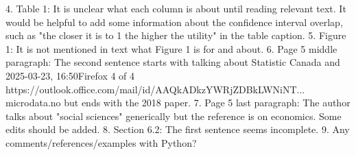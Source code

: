 \begin{referee}
4.
Table 1: It is unclear what each column is about until reading relevant text. It would be helpful to
add some information about the confidence interval overlap, such as "the closer it is to 1 the higher
the utility" in the table caption.
5.
Figure 1: It is not mentioned in text what Figure 1 is for and about.
6.
Page 5 middle paragraph: The second sentence starts with talking about Statistic Canada and
2025-03-23, 16:50Firefox
4 of 4
https://outlook.office.com/mail/id/AAQkADkzYWRjZDBkLWNiNT...
microdata.no but ends with the 2018 paper.
7.
Page 5 last paragraph: The author talks about "social sciences" generically but the reference is
on economics. Some edits should be added.
8.
Section 6.2: The first sentence seems incomplete.
9.
Any comments/references/examples with Python?
\end{referee}
